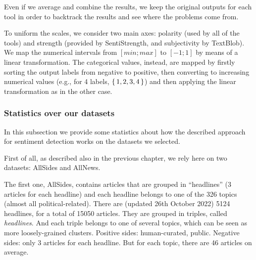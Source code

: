 

Even if we average and combine the results, we keep the original outputs for each tool in order to backtrack the results and see where the problems come from.

To uniform the scales, we consider two main axes: polarity (used by all of the tools) and strength (provided by SentiStrength, and subjectivity by TextBlob). We map the numerical intervals from $[min;max]$ to $[-1;1]$ by means of a linear transformation. The categorical values, instead, are mapped by firstly sorting the output labels from negative to positive, then converting to increasing numerical values (e.g., for 4 labels, $\set{1,2,3,4}$) and then applying the linear transformation as in the other case.

\subsubsection{\statusred Statistics over our datasets}

In this subsection we provide some statistics about how the described approach for sentiment detection works on the datasets we selected.

First of all, as described also in the previous chapter, we rely here on two datasets: AllSides and AllNews.

The first one, AllSides, contains articles that are grouped in “headlines” (3 articles for each headline) and each headline belongs to one of the 326 topics (almost all political-related). There are (updated 26th October 2022) 5124 headlines, for a total of 15050 articles. They are grouped in triples, called \emph{headlines}. And each triple belongs to one of several topics, which can be seen as more loosely-grained clusters. Positive sides: human-curated, public. Negative sides: only 3 articles for each headline. But for each topic, there are 46 articles on average.

